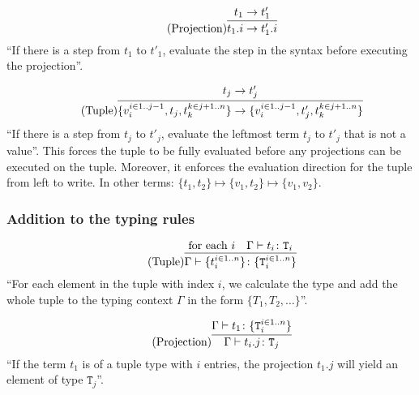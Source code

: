 \begin{equation*}
    \tag{Projection}
    \infer{
        t_1 . i \rightarrow t'_1 . i
    }{
        t_1 \rightarrow t'_1
    }
\end{equation*}
``If there is a step from $t_1$ to $t'_1$, evaluate the step
in the syntax before executing the projection''.

\begin{equation*}
    \tag{Tuple}
    \infer{
    \{v_i^{i \in 1..j-1}, t_j, t_k^{k \in j+1..n}\} \rightarrow \{v_i^{i \in 1..j-1}, t'_j, t_k^{k \in j+1..n}\}
    }{
    t_j \rightarrow t'_j
    }
\end{equation*}
``If there is a step from $t_j$ to $t'_j$, evaluate the leftmost
term $t_j$ to $t'_j$ that is not a value''. This forces the tuple to
be fully evaluated before any projections can be executed on the tuple.
Moreover, it enforces the evaluation direction for the tuple from left to write.
In other terms: $\{t_1, t_2\} \mapsto \{v_1, t_2\} \mapsto \{v_1, v_2\}$.

\subsubsection{Addition to the typing rules \cite{pierce2002ProgLang}}
\begin{equation*}
    \tag{Tuple}
    \infer{
    \Gamma \vdash \{t_i^{i \in 1..n}\} \colon \{\texttt{T}_i^{i \in 1..n}\}
    }{
    \text{for each } i & \Gamma \vdash t_i \colon \texttt{T}_i
    }
\end{equation*}
``For each element in the tuple with index $i$, we calculate the type
and add the whole tuple to the typing context $\Gamma$ in the form $\{T_1, T_2, \dots\}$''.

\begin{equation*}
    \tag{Projection}
    \infer{
    \Gamma \vdash t_i . j \colon \texttt{T}_j
    }{
    \Gamma \vdash t_1 \colon \{\texttt{T}_i^{i \in 1..n}\}
    }
\end{equation*}
``If the term $t_1$ is of a tuple type with $i$ entries, the projection
$t_1 . j$ will yield an element of type $\texttt{T}_j$''.
